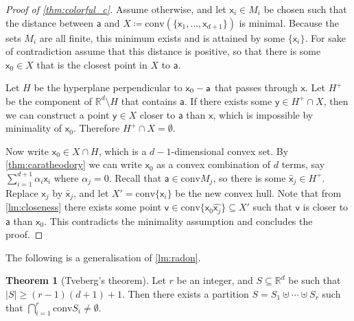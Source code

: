 \documentclass[12pt]{amsart}
\theoremstyle{definition}
\newtheorem{thm}{Theorem}[section]
\newcommand{\R}{\mathbb{R}}
\newcommand{\vv}{\mathsf{v}}
\newcommand{\vx}{\mathsf{x}}
\newcommand{\vy}{\mathsf{y}}
\newcommand{\va}{\mathsf{a}}
\newcommand{\conv}{\mathrm{conv}}
\begin{document}
\begin{proof}[Proof of \cref{thm:colorful_c}]
Assume otherwise, and let $\vx_i \in M_i$ be chosen such that the distance between $\va $ and $X \coloneqq \conv(\{\vx_1, \ldots, \vx_{d+1}\})$ is minimal.
Because the sets $M_i$ are all finite, this minimum exists and is attained by some $\{\vx_i\}$.
For sake of contradiction assume that this distance is positive, so that there is some $\vx_0 \in X $ that is the closest point in $X$ to $\va$.

Let $H$ be the hyperplane perpendicular to $\vx_0 \-- \va$ that passes through $\vx$.
Let $H^+$ be the component of $\R^d\setminus H $ that contains $\va$.
If there exists some $\vy \in H^+ \cap X$, then we can construct a point $\vy \in X$ closer to $\va$ than $\vx$, which is impossible by minimality of $\vx_0$.
Therefore $H^+ \cap X = \emptyset$.

Now write $\vx_0 \in X \cap H$, which is a $d-1$-dimensional convex set.
By \cref{thm:caratheodory} we can write $\vx_0$ as a convex combination of $d$ terms, say $\sum_{i=1}^{d+1} \alpha_i \vx_i$ where $\alpha_j = 0$.
Recall that $\va \in \conv M_j$, so there is some $\hat{\vx}_j \in H^+$.
Replace $\vx_j$ by $\hat{\vx}_j$, and let $X' = \conv\{\vx_i\}$ be the new convex hull.
Note that from \cref{lm:closeness} there exists some point $\vv \in \conv\{\vx_0 \hat{\vx_j}\} \subseteq X'$ such that $\vv$ is closer to $\va$ than $\vx_0$.
This contradicts the minimality assumption and concludes the proof.
\end{proof}

The following is a generalisation of \cref{lm:radon}.

\begin{thm}[Tveberg's theorem]
Let $r$ be an integer, and $S \subseteq \R^d$ be such that $|S| \geq (r-1)(d+1) + 1$.
Then there exists a partition $S = S_1\uplus \cdots \uplus S_r$ such that $\bigcap_{i=1}^r \conv S_i \neq \emptyset$.
\end{thm}
\end{document}

